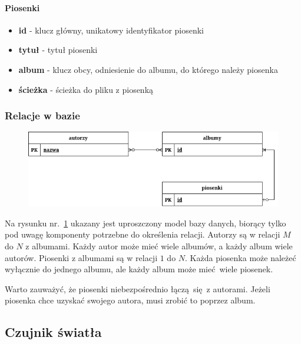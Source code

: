 \paragraph{Piosenki}

\begin{itemize}
	\item \textbf{id} - klucz główny, unikatowy identyfikator piosenki
	
	\item \textbf{tytuł} - tytuł piosenki
	
	\item \textbf{album} - klucz obcy, odniesienie do albumu, do którego należy piosenka
	
	\item \textbf{ścieżka} - ścieżka do pliku z piosenką
\end{itemize}

\subsubsection{Relacje w bazie} \label{sec:dbrelations}

\begin{figure}[H]
	\centering
	\includegraphics[width=1\textwidth]{images/ch3-db-relacje.drawio.png}
	\caption{}
	\label{fig:dbrelations}
\end{figure}

Na rysunku nr.~\ref{fig:dbrelations} ukazany jest uproszczony model bazy danych, biorący tylko pod uwagę komponenty potrzebne do określenia relacji. Autorzy są w relacji $M$ do $N$ z albumami. Każdy autor może mieć wiele albumów, a każdy album wiele autorów. Piosenki z albumami są w relacji $1$ do $N$. Każda piosenka może należeć wyłącznie do jednego albumu, ale każdy album może mieć wiele piosenek.

Warto zauważyć, że piosenki niebezpośrednio łączą się z autorami. Jeżeli piosenka chce uzyskać swojego autora, musi zrobić to poprzez album.

\subsection{Czujnik światła}

